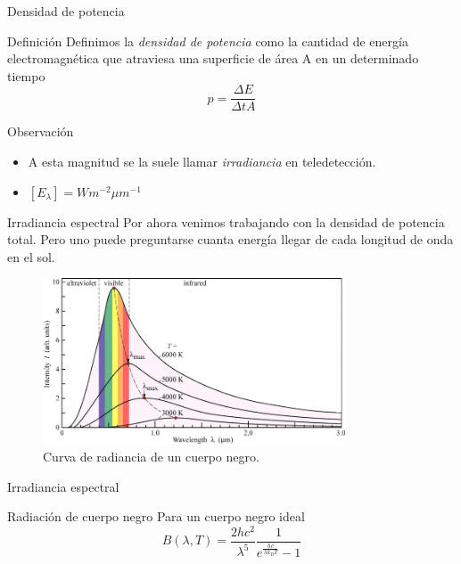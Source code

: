 \documentclass[]{article}
\begin{document}
\begin{frame}{Densidad de potencia}
  \begin{block}{Definición}
    Definimos la \emph{densidad de potencia} como la cantidad de energía electromagnética que atraviesa una superficie de área A en un determinado tiempo
    \begin{equation}
      p = \frac{\Delta E}{\Delta t A}
    \end{equation}
  \end{block}\pause
  \begin{block}{Observación}
  \begin{itemize}[<+->]
    \item A esta magnitud se la suele llamar \emph{irradiancia} en teledetección.
    \item $[E_\lambda] = W m^{-2} \mu m^{-1}$
  \end{itemize}
  \end{block}
\end{frame}

\begin{frame}{Irradiancia espectral}
  Por ahora venimos trabajando con la densidad de potencia total. Pero uno puede preguntarse cuanta energía llegar de cada longitud de onda en el sol.
  \begin{figure}
    \includegraphics[width=0.8\textwidth]{imagenes/black-body-radiation-curves.png}
    \caption{Curva de radiancia de un cuerpo negro.}
  \end{figure}
\end{frame}

\begin{frame}{Irradiancia espectral}
  \begin{block}{Radiación de cuerpo negro}
    Para un cuerpo negro ideal
    \begin{equation}
      B(\lambda,T) = \frac{2hc^2}{\lambda^5}\frac{1}{e^{\frac{hc}{\lambda k_B T}}-1}
    \end{equation}
  \end{block}
\end{frame}
\end{document}
